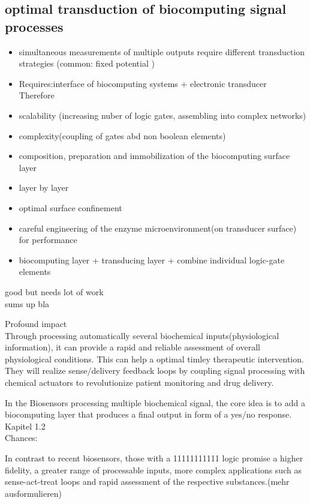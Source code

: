 \documentclass[runningheads]{llncs}
\begin{document}
\subsection{optimal transduction of biocomputing signal processes}
\begin{itemize}
	\item simultaneous measurements of multiple outputs require different transduction strategies (common: fixed potential )
\end{itemize}
\begin{itemize}
	\item Requires:interface of biocomputing systems + electronic transducer\\
	Therefore
	\item scalability (increasing nuber of logic gates, assembling into complex networks)
	\item complexity(coupling of gates abd non boolean elements)
	\item composition, preparation and immobilization of the biocomputing surface layer
	\item layer by layer
	\item optimal surface confinement 
	\item careful engineering of the enzyme microenvironment(on transducer surface) for performance
	\item biocomputing layer + transducing layer + combine individual logic-gate elements	
\end{itemize}

	good but needs lot of work\\
	sums up bla
	
		Profound impact\\
	
	Through processing automatically several biochemical inputs(physiological information), it can provide a rapid and reliable assessment of overall physiological conditions. This can help a optimal timley therapeutic intervention. They will realize sense/delivery feedback loops by coupling signal processing with chemical actuators to revolutionize patient monitoring and drug delivery. 
	
	In the Biosensors processing multiple biochemical signal, the core idea is to add a biocomputing layer that produces a final output in form of a yes/no response. Kapitel 1.2\\
	
	Chances:
	
	
	
	
	In contrast to recent biosensors, those with a 11111111111 logic promise a higher fidelity, a greater range of processable inputs, more complex applications such as sense-act-treat loops and rapid assessment of the respective substances.(mehr ausformulieren)
	
\end{document}
